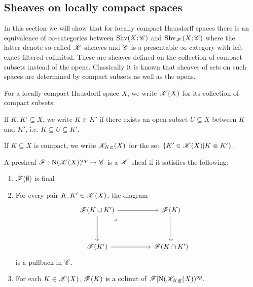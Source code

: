 \documentclass[../thesis.tex]{subfiles}
\begin{document}
\subsection{Sheaves on locally compact spaces}
In this section we will show that for locally compact Hausdorff spaces there is an equivalence of $\infty$-categories between $\mathrm{Shv}(X;\mathscr{C})$ and $\mathrm{Shv}_{\mathscr{K}}(X;\mathscr{C})$ where the latter denote so-called $\mathscr{K}$-sheaves and $\mathscr{C}$ is a presentable $\infty$-category with left exact filtered colimitsd.
These are sheaves defined on the collection of compact subsets instead of the opens.
Classically it is known that sheaves of sets on such spaces are determined by compact subsets as well as the opens.
\begin{definition}
    For a locally compact Hausdorff space $X$, we write $\mathscr{K}(X)$ for its collection of compact subsets.
\end{definition}
\begin{definition}
    If $K, K' \subseteq X$, we write $K \Subset K'$ if there exists an open subset $U\subseteq X$ between $K$ and $K'$, i.e. $K \subseteq U \subseteq K'$.
\end{definition}
\begin{definition}
    If $K\subseteq X$ is compact, we write $\mathscr{K}_{K\Subset}(X)$ for the set $\{ K'\in \mathscr{K}(X) | K \Subset K' \}$.
\end{definition}
\begin{definition}
    A presheaf $\mathscr{F}:\mathrm{N}(\mathscr{K}(X))^{op}\to \mathscr{C}$ is a $\mathscr{K}$-sheaf if it satisfies the following:
    \begin{enumerate}
        \item $\mathscr{F}(\emptyset)$ is final
        \item For every pair $K,K'\in \mathscr{K}(X)$, the diagram
              \[\begin{tikzcd}
                      {\F(K \cup K')} && {\F(K)} \\
                      \\
                      {\F(K')} && {\F(K\cap K')}
                      \arrow[from=1-3, to=3-3]
                      \arrow[from=3-1, to=3-3]
                      \arrow[from=1-1, to=3-1]
                      \arrow["\lrcorner"{anchor=center, pos=0.125}, draw=none, from=1-1, to=3-3]
                      \arrow[from=1-1, to=1-3]
                  \end{tikzcd}\]
              is a pullback in $\mathscr{C}$.
        \item For each $K\in \mathscr{K}(X)$, $\mathscr{F}(K)$ is a colimit of $\mathscr{F}|\mathrm{N}(\mathscr{K}_{K\Subset}(X))^{op}$.
    \end{enumerate}
\end{definition}
\end{document}
